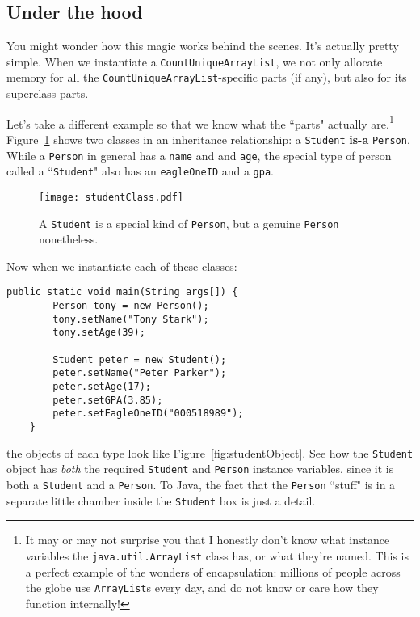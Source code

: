 \subsection{Under the hood}

You might wonder how this magic works behind the scenes. It's actually pretty
simple. When we instantiate a \texttt{CountUniqueArrayList}, we not only
allocate memory for all the \texttt{CountUniqueArrayList}-specific parts (if
any), but also for its superclass parts.

Let's take a different example so that we know what the ``parts" actually
are.\footnote{It may or may not surprise you that I honestly don't know what
instance variables the \texttt{java.util.ArrayList} class has, or what they're
named. This is a perfect example of the wonders of encapsulation: millions of
people across the globe use \texttt{ArrayList}s every day, and do not know or
care how they function internally!} Figure~\ref{fig:studentClass} shows two
classes in an inheritance relationship: a \texttt{Student} \textbf{is-a}
\texttt{Person}. While a \texttt{Person} in general has a \texttt{name} and 
and \texttt{age}, the special type of person called a ``\texttt{Student}" also
has an \texttt{eagleOneID} and a \texttt{gpa}.

\begin{figure}
\centering
\texttt{[image: studentClass.pdf]}
\caption{A \texttt{Student} is a special kind of \texttt{Person}, but a
genuine \texttt{Person} nonetheless.}
\label{fig:studentClass}
\end{figure}

\begin{samepage}
Now when we instantiate each of these classes:

\begin{Verbatim}[fontsize=\footnotesize,samepage=true,frame=single]
    public static void main(String args[]) {
        Person tony = new Person();
        tony.setName("Tony Stark");
        tony.setAge(39);

        Student peter = new Student();
        peter.setName("Peter Parker");
        peter.setAge(17);
        peter.setGPA(3.85);
        peter.setEagleOneID("000518989");
    }
\end{Verbatim}
\end{samepage}

the objects of each type look like Figure~\ref{fig:studentObject}. See how the
\texttt{Student} object has \textit{both} the required \texttt{Student} and
\texttt{Person} instance variables, since it is both a \texttt{Student} and a
\texttt{Person}. To Java, the fact that the \texttt{Person} ``stuff" is in a
separate little chamber inside the \texttt{Student} box is just a detail.

